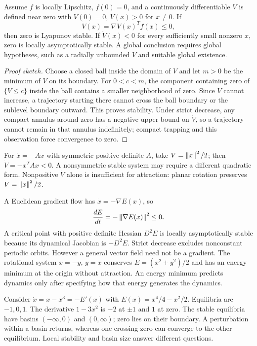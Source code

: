 \begin{theorem}\label{thm:lyapunov-function}
Assume $f$ is locally Lipschitz, $f(0)=0$, and a continuously differentiable $V$ is defined near zero with $V(0)=0$, $V(x)>0$ for $x\ne0$. If
\begin{equation}\label{eq:vdot}
\dot V(x)=\nabla V(x)^Tf(x)\leq0,
\end{equation}
then zero is Lyapunov stable. If $\dot V(x)<0$ for every sufficiently small nonzero $x$, zero is locally asymptotically stable. A global conclusion requires global hypotheses, such as a radially unbounded $V$ and suitable global existence.
\end{theorem}
\begin{proof}[Proof sketch]
Choose a closed ball inside the domain of $V$ and let $m>0$ be the minimum of $V$ on its boundary. For $0<c<m$, the component containing zero of $\{V\leq c\}$ inside the ball contains a smaller neighborhood of zero. Since $V$ cannot increase, a trajectory starting there cannot cross the ball boundary or the sublevel boundary outward. This proves stability. Under strict decrease, any compact annulus around zero has a negative upper bound on $\dot V$, so a trajectory cannot remain in that annulus indefinitely; compact trapping and this observation force convergence to zero.
\end{proof}
For $\dot x=-Ax$ with symmetric positive definite $A$, take $V=\left\lVert x\right\rVert^2/2$; then $\dot V=-x^TAx<0$. A nonsymmetric stable system may require a different quadratic form. Nonpositive $\dot V$ alone is insufficient for attraction: planar rotation preserves $V=\left\lVert x\right\rVert^2/2$.

A Euclidean gradient flow has $\dot x=-\nabla E(x)$, so
\begin{equation}\label{eq:gradient-energy}
\frac{dE}{dt}=-\left\lVert \nabla E(x)\right\rVert^2\leq0.
\end{equation}
A critical point with positive definite Hessian $D^2E$ is locally asymptotically stable because its dynamical Jacobian is $-D^2E$. Strict decrease excludes nonconstant periodic orbits. However a general vector field need not be a gradient. The rotational system $\dot x=-y$, $\dot y=x$ conserves $E=(x^2+y^2)/2$ and has an energy minimum at the origin without attraction. An energy minimum predicts dynamics only after specifying how that energy generates the dynamics.

\begin{example}\label{ex:double-well}
Consider $\dot x=x-x^3=-E'(x)$ with $E(x)=x^4/4-x^2/2$. Equilibria are $-1,0,1$. The derivative $1-3x^2$ is $-2$ at $\pm1$ and $1$ at zero. The stable equilibria have basins $(-\infty,0)$ and $(0,\infty)$; zero lies on their boundary. A perturbation within a basin returns, whereas one crossing zero can converge to the other equilibrium. Local stability and basin size answer different questions.
\end{example}

